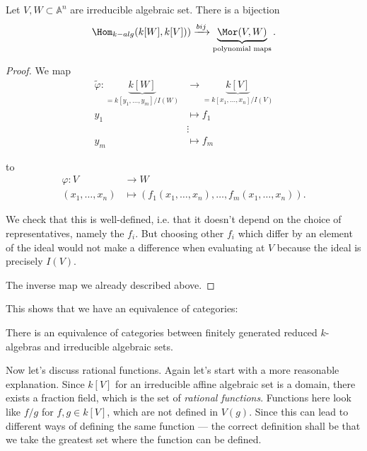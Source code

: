\documentclass{book}
\begin{document}
\begin{proposition}
\label{proposition-irreducible-prime}
Let $V,W \subset \mathbb{A}^n$ are
irreducible algebraic set.
There is a bijection
$$
\Hom_{k-alg}(k[W],k[V]))
\xrightarrow{bij}\underbrace{\Mor(V,W)}_{
\text{polynomial maps}}.
$$
\end{proposition}

\begin{proof}
We map
$$
\begin{aligned}
\tilde{\varphi}:
\underbrace{k[W]}_{=k[y_1,…,y_m]/I(W)}
&\longrightarrow
\underbrace{k[V]}_{=k[x_1,…,x_n]/I(V)} \\
 y_1&\longmapsto f_1\\
&\vdots \\
y_m & \longmapsto f_m
\end{aligned}
$$

\noindent
to
$$
\begin{aligned}
\varphi: V &\longrightarrow W \\
(x_1,…,x_n) &\longmapsto (f_1(x_1,…,x_n), …,
f_m(x_1,…,x_n)).
\end{aligned}
$$

\noindent
We check that this is well-defined, i.e.
that it doesn't depend on the choice of
representatives,
namely the $f_i$. But choosing other $f_i$
which differ
by an element of the ideal would not make a
difference
when evaluating at $V$ because the ideal is
precisely $I(V)$.

The inverse map we already described above.
\end{proof}

\noindent
This shows that we have an equivalence of
categories:

\begin{lemma}
\label{lemma-algeb-varie-categ-equiv}
There is an equivalence of categories between
finitely generated reduced
$k$-algebras
and irreducible algebraic sets.
\end{lemma}


\medskip\noindent
Now let's discuss rational functions.
Again let's start with a more reasonable
explanation.
Since $k[V]$ for an irreducible affine
algebraic set is a domain,
there exists a fraction field, which is the
set of {\it rational functions}.
Functions here look like $f/g$ for $f,g \in
k[V]$,
which are not defined in $V(g)$.
Since this can lead to different ways
of defining the same function
--- the correct definition shall be that
we take the greatest set where the function
can be defined.
\end{document}

